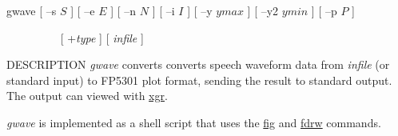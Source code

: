 % 
% 
% 
% 
%                                                                        
%
\hypertarget{gwave}{}

\begin{synopsis}
\item[gwave] [ --s $S$ ] [ --e $E$ ] [ --n $N$ ] [ --i $I$ ] [ --y $ymax$ ]
	       [ --y2 $ymin$ ] [ --p $P$ ] 
\item[\ ~~~~~~~~] [ +{\em type} ]  [ {\em infile} ]

\end{synopsis}

\begin{qsection}{DESCRIPTION}
{\em gwave} converts converts speech waveform data 
from {\em infile} (or standard input) to FP5301 plot format, 
sending the result to standard output. 
The output can viewed with \hyperlink{xgr}{xgr}.

{\em gwave} is implemented as a shell script 
that uses the \hyperlink{fig}{fig} and \hyperlink{fdrw}{fdrw} commands.
\end{qsection}

